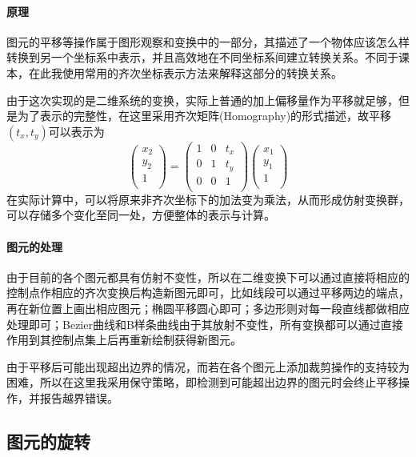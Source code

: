 \documentclass[a4paper,UTF8]{article}
\theoremstyle{definition}
\begin{document}
\paragraph{原理} 图元的平移等操作属于图形观察和变换中的一部分，其描述了一个物体应该怎么样转换到另一个坐标系中表示，并且高效地在不同坐标系间建立转换关系。不同于课本，在此我使用常用的齐次坐标表示方法来解释这部分的转换关系。
\par 由于这次实现的是二维系统的变换，实际上普通的加上偏移量作为平移就足够，但是为了表示的完整性，在这里采用齐次矩阵(Homography)的形式描述，故平移$(t_x,t_y)$可以表示为
\begin{equation}
\left(
\begin{array}{c}
x_2 \\
y_2 \\
1 \\
\end{array}
\right)
=\left(
\begin{array}{ccc}
1 & 0 & t_x \\
0 & 1 & t_y \\
0 & 0 & 1 \\
\end{array}
\right)
\left(
\begin{array}{c}
x_1 \\
y_1 \\
1 \\
\end{array}
\right)
\end{equation}
在实际计算中，可以将原来非齐次坐标下的加法变为乘法，从而形成仿射变换群，可以存储多个变化至同一处，方便整体的表示与计算。
\paragraph{图元的处理} 由于目前的各个图元都具有仿射不变性，所以在二维变换下可以通过直接将相应的控制点作相应的齐次变换后构造新图元即可，比如线段可以通过平移两边的端点，再在新位置上画出相应图元；椭圆平移圆心即可；多边形则对每一段直线都做相应处理即可；Bezier曲线和B样条曲线由于其放射不变性，所有变换都可以通过直接作用到其控制点集上后再重新绘制获得新图元。
\par 由于平移后可能出现超出边界的情况，而若在各个图元上添加裁剪操作的支持较为困难，所以在这里我采用保守策略，即检测到可能超出边界的图元时会终止平移操作，并报告越界错误。
\subsection{图元的旋转}
\end{document}
